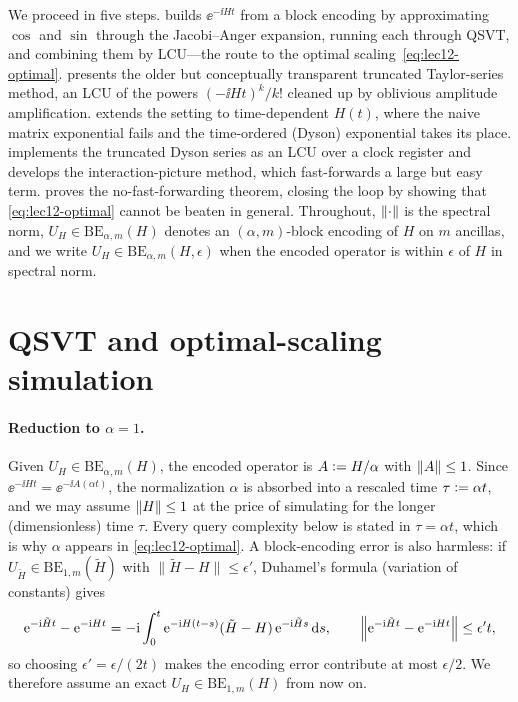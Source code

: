 We proceed in five steps.  builds $\ee^{-\ii Ht}$ from a block encoding
by approximating $\cos$ and $\sin$ through the Jacobi--Anger expansion, running each
through QSVT, and combining them by LCU---the route to the optimal
scaling~\eqref{eq:lec12-optimal}.  presents the older but conceptually
transparent truncated Taylor-series method, an LCU of the powers $(-\ii Ht)^k/k!$ cleaned
up by oblivious amplitude amplification.  extends the setting to
time-dependent $H(t)$, where the naive matrix exponential fails and the time-ordered
(Dyson) exponential takes its place.  implements the truncated Dyson
series as an LCU over a clock register and develops the interaction-picture method, which
fast-forwards a large but easy term.  proves the no-fast-forwarding
theorem, closing the loop by showing that \eqref{eq:lec12-optimal} cannot be beaten in
general. Throughout, $\left\lVert \cdot \right\rVert$ is the spectral norm, $U_H\in\mathrm{BE}_{\alpha,m}(H)$
denotes an $(\alpha,m)$-block encoding of $H$ on $m$ ancillas, and we write
$U_H\in\mathrm{BE}_{\alpha,m}(H,\epsilon)$ when the encoded operator is within $\epsilon$
of $H$ in spectral norm.

\section{QSVT and optimal-scaling simulation}
\label{sec:lec12-1}

\paragraph{Reduction to \texorpdfstring{$\alpha=1$}{alpha=1}.}
Given $U_H\in\mathrm{BE}_{\alpha,m}(H)$, the encoded operator is $A\vcentcolon= H/\alpha$ with
$\left\lVert A \right\rVert\le1$. Since $\ee^{-\ii Ht}=\ee^{-\ii A(\alpha t)}$, the normalization $\alpha$
is absorbed into a rescaled time $\tau\vcentcolon=\alpha t$, and we may assume $\left\lVert H \right\rVert\le1$ at
the price of simulating for the longer (dimensionless) time $\tau$. Every query complexity
below is stated in $\tau=\alpha t$, which is why $\alpha$ appears in
\eqref{eq:lec12-optimal}. A block-encoding error is also harmless: if
$U_{\tilde H}\in\mathrm{BE}_{1,m}(\tilde H)$ with $\|\tilde H-H\|\le\epsilon'$, Duhamel's
formula (variation of constants) gives
\begin{equation}
  \mathrm{e}^{-\mathrm{i}\tilde Ht}-\mathrm{e}^{-\mathrm{i} Ht}
  =-\mathrm{i}\int_0^t\mathrm{e}^{-\mathrm{i} H(t-s)}(\tilde H-H)\,\mathrm{e}^{-\mathrm{i}\tilde Hs}\,\mathrm{d} s,
  \qquad
  \left\lVert \mathrm{e}^{-\mathrm{i}\tilde Ht}-\mathrm{e}^{-\mathrm{i} Ht} \right\rVert\le\epsilon' t,
  \label{eq:lec12-duhamel-pert}
\end{equation}
so choosing $\epsilon'=\epsilon/(2t)$ makes the encoding error contribute at most
$\epsilon/2$. We therefore assume an exact $U_H\in\mathrm{BE}_{1,m}(H)$ from now on.

